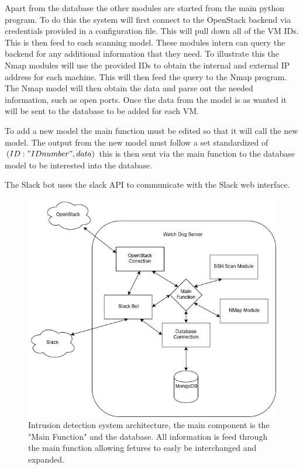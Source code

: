 \documentclass[12pt]{article}
\begin{document}
Apart from the database the other modules are started from the main python program. To do this the system will first connect to the OpenStack backend via credentials provided in a configuration file. This will pull down all of the VM IDs. This is then feed to each scanning model. These modules intern can query the backend for any additional information that they need. To illustrate this the Nmap modules will use the provided IDs to obtain the internal and external IP address for each machine. This will then feed the query to the Nmap program. The Nmap model will then obtain the data and parse out the needed information, such as open ports. Once the data from the model is as wanted it will be sent to the database to be added for each VM.

To add a new model the main function must be edited so that it will call the new model. The output from the new model must follow a set standardized of $(ID: "ID number", data)$ this is then sent via the main function to the database model to be interested into the database.

The Slack bot uses the slack API to communicate with the Slack web interface.

\begin{figure}[ht]
    \includegraphics[scale=.5]{./pic/Arcitecture.png}
    \caption{Intrusion detection system architecture, the main component is the "Main Function" and the database. All information is feed through the main function allowing fetures to easly be interchanged and expanded.}
\end{figure}
\end{document}
